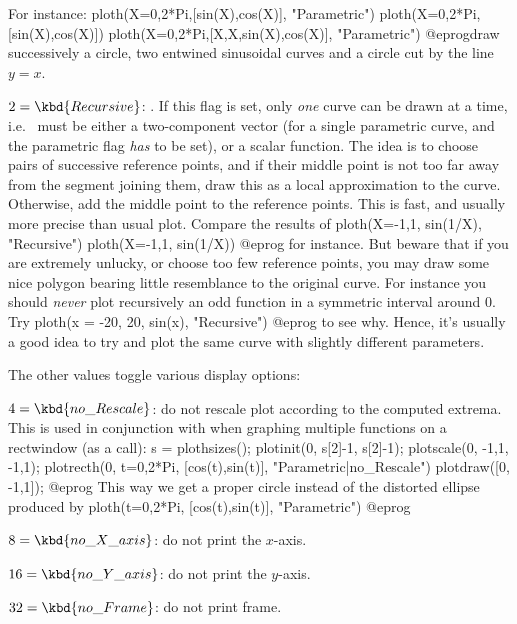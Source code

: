 For instance:
\bprog
ploth(X=0,2*Pi,[sin(X),cos(X)], "Parametric")
ploth(X=0,2*Pi,[sin(X),cos(X)])
ploth(X=0,2*Pi,[X,X,sin(X),cos(X)], "Parametric")
@eprog\noindent draw successively a circle, two entwined sinusoidal curves
and a circle cut by the line $y=x$.

\item $2 = \kbd{Recursive}$: . If this flag is set,
only \emph{one} curve can be drawn at a time, i.e.~ must be either a
two-component vector (for a single parametric curve, and the parametric flag
\emph{has} to be set), or a scalar function. The idea is to choose pairs of
successive reference points, and if their middle point is not too far away
from the segment joining them, draw this as a local approximation to the
curve. Otherwise, add the middle point to the reference points. This is
fast, and usually more precise than usual plot. Compare the results of
\bprog
ploth(X=-1,1, sin(1/X), "Recursive")
ploth(X=-1,1, sin(1/X))
@eprog\noindent
for instance. But beware that if you are extremely unlucky, or choose too few
reference points, you may draw some nice polygon bearing little resemblance
to the original curve. For instance you should \emph{never} plot recursively
an odd function in a symmetric interval around 0. Try
\bprog
ploth(x = -20, 20, sin(x), "Recursive")
@eprog\noindent
to see why. Hence, it's usually a good idea to try and plot the same curve
with slightly different parameters.

The other values toggle various display options:

\item $4 = \kbd{no\_Rescale}$: do not rescale plot according to the
computed extrema. This is used in conjunction with  when
graphing multiple functions on a rectwindow (as a  call):
\bprog
  s = plothsizes();
  plotinit(0, s[2]-1, s[2]-1);
  plotscale(0, -1,1, -1,1);
  plotrecth(0, t=0,2*Pi, [cos(t),sin(t)], "Parametric|no_Rescale")
  plotdraw([0, -1,1]);
@eprog\noindent
This way we get a proper circle instead of the distorted ellipse produced by
\bprog
  ploth(t=0,2*Pi, [cos(t),sin(t)], "Parametric")
@eprog

\item $8 = \kbd{no\_X\_axis}$: do not print the $x$-axis.

\item $16 = \kbd{no\_Y\_axis}$: do not print the $y$-axis.

\item $32 = \kbd{no\_Frame}$: do not print frame.

